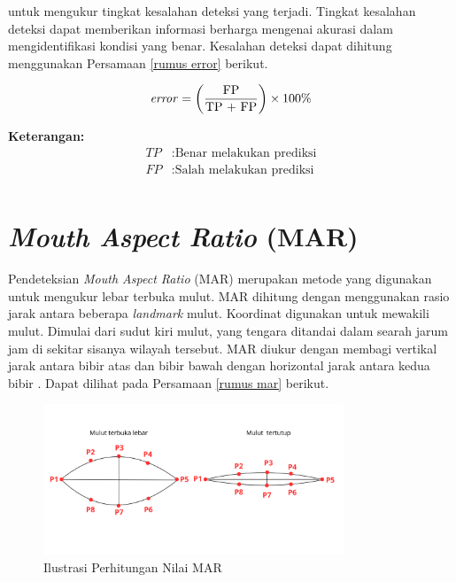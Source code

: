      untuk mengukur tingkat kesalahan deteksi yang terjadi. Tingkat kesalahan deteksi dapat memberikan informasi berharga mengenai akurasi dalam mengidentifikasi kondisi yang benar. Kesalahan deteksi dapat dihitung menggunakan Persamaan \ref{rumus error} berikut.


    \begin{equation}
        \label{rumus error}
        \begin{aligned}
        \text{\textit{error}} = \left(\frac{\text{FP}}{\text{TP + FP}}\right) \times 100\%
        \end{aligned}
    \end{equation}

       \textbf{Keterangan:}
      \begin{align*}
        TP & : \text{Benar melakukan prediksi} \\
        FP & : \text{Salah melakukan prediksi} \\
    \end{align*}

   

\section{\textit{Mouth Aspect Ratio} (MAR)}

Pendeteksian \textit{Mouth Aspect Ratio} (MAR) merupakan metode yang digunakan untuk mengukur lebar terbuka mulut. MAR dihitung dengan menggunakan rasio jarak antara beberapa \textit{landmark} mulut. Koordinat digunakan untuk mewakili mulut. Dimulai dari
sudut kiri mulut, yang tengara ditandai dalam searah jarum jam di sekitar sisanya
wilayah tersebut. MAR diukur dengan membagi vertikal jarak antara bibir atas dan bibir bawah dengan horizontal jarak antara kedua bibir \cite{inproceedings, jimaging9050091}. Dapat dilihat pada Persamaan \ref{rumus mar} berikut.


    \begin{figure}[H]
      \centering
      \includegraphics[width=0.8\textwidth]{figures/bab2/mar.png}
      \caption[Ilustrasi Perhitungan Nilai MAR]{Ilustrasi Perhitungan Nilai MAR}
      \label{Ilustrasi Perhitungan Nilai MAR}
    \end{figure}


